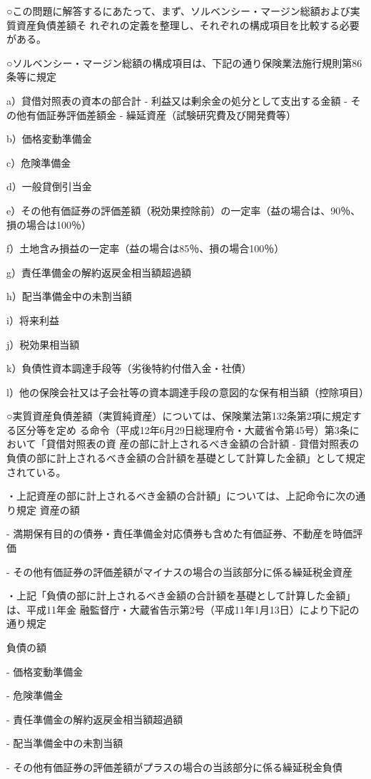\documentclass[report,gutter=10mm,fore-edge=10mm,uplatex,dvipdfmx]{jlreq}
\begin{document}
○この問題に解答するにあたって、まず、ソルベンシー・マージン総額および実質資産負債差額そ
れぞれの定義を整理し、それぞれの構成項目を比較する必要がある。

○ソルベンシー・マージン総額の構成項目は、下記の通り保険業法施行規則第86条等に規定

a）貸借対照表の資本の部合計  -  利益又は剰余金の処分として支出する金額  -  その他有価証券評価差額金
 -  繰延資産（試験研究費及び開発費等）

b）価格変動準備金

c）危険準備金

d）一般貸倒引当金

e）その他有価証券の評価差額（税効果控除前）の一定率（益の場合は、90％、損の場合は100％）

f）土地含み損益の一定率（益の場合は85％、損の場合100％）

g）責任準備金の解約返戻金相当額超過額

h）配当準備金中の未割当額

i）将来利益

j）税効果相当額

k）負債性資本調達手段等（劣後特約付借入金・社債）

l）他の保険会社又は子会社等の資本調達手段の意図的な保有相当額（控除項目）

○実質資産負債差額（実質純資産）については、保険業法第132条第2項に規定する区分等を定め
る命令（平成12年6月29日総理府令・大蔵省令第45号）第3条において「貸借対照表の資
産の部に計上されるべき金額の合計額
 -  貸借対照表の負債の部に計上されるべき金額の合計額を基礎として計算した金額」として規定されている。

・上記資産の部に計上されるべき金額の合計額」については、上記命令に次の通り規定
資産の額

 - 満期保有目的の債券・責任準備金対応債券も含めた有価証券、不動産を時価評価

 - その他有価証券の評価差額がマイナスの場合の当該部分に係る繰延税金資産

・上記「負債の部に計上されるべき金額の合計額を基礎として計算した金額」は、平成11年金
融監督庁・大蔵省告示第2号（平成11年1月13日）により下記の通り規定

負債の額

 - 価格変動準備金

 - 危険準備金

 - 責任準備金の解約返戻金相当額超過額

 - 配当準備金中の未割当額

 - その他有価証券の評価差額がプラスの場合の当該部分に係る繰延税金負債
\end{document}
